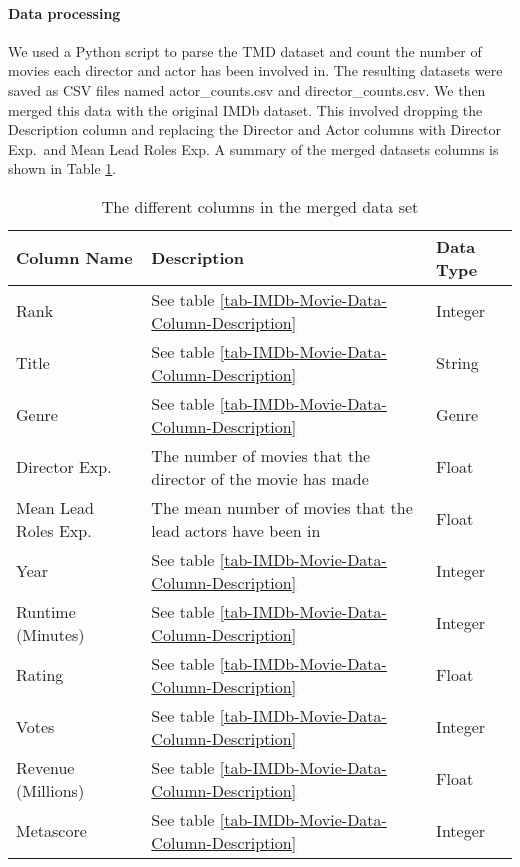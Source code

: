     \paragraph{Data processing}
        We used a Python script to parse the TMD dataset and count the number of movies
            each director and actor has been involved in.
        The resulting datasets were saved as CSV files named actor\_counts.csv and
            director\_counts.csv.
        We then merged this data with the original IMDb dataset.
        This involved dropping the Description column and replacing the Director and
            Actor columns with Director Exp.~and Mean Lead Roles Exp.
        A summary of the merged datasets columns is shown in Table
            \ref*{tab-merged-data-column-description}.

        \begin{table}[h]
            \begin{tabular}{lp{9cm}l}
                \toprule
                Column Name           & Description                                                  & Data Type \\
                \midrule
                Rank                  & See table \ref{tab-IMDb-Movie-Data-Column-Description}       & Integer   \\
                Title                 & See table \ref{tab-IMDb-Movie-Data-Column-Description}       & String    \\
                Genre                 & See table \ref{tab-IMDb-Movie-Data-Column-Description}       & Genre     \\
                Director Exp.~        & The number of movies that the director of the movie has made & Float     \\
                Mean Lead Roles Exp.~ & The mean number of movies that the lead actors have been in  & Float     \\
                Year                  & See table \ref{tab-IMDb-Movie-Data-Column-Description}       & Integer   \\
                Runtime (Minutes)     & See table \ref{tab-IMDb-Movie-Data-Column-Description}       & Integer   \\
                Rating                & See table \ref{tab-IMDb-Movie-Data-Column-Description}       & Float     \\
                Votes                 & See table \ref{tab-IMDb-Movie-Data-Column-Description}       & Integer   \\
                Revenue (Millions)    & See table \ref{tab-IMDb-Movie-Data-Column-Description}       & Float     \\
                Metascore             & See table \ref{tab-IMDb-Movie-Data-Column-Description}       & Integer   \\
                \bottomrule
            \end{tabular}
            \caption[short]{The different columns in the merged data set}\label{tab-merged-data-column-description}
        \end{table}

